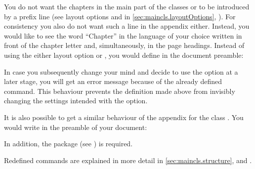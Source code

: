 \begin{Example}
  You do not want the chapters in the main part of the classes
   or  to be introduced by a prefix
  line (see layout options  and
   in \autoref{sec:maincls.layoutOptions},
  ). For consistency
  you also do not want such a line in the appendix either. Instead,
  you would like to see the word ``Chapter'' in the language of your
  choice written in front of the chapter letter and, simultaneously,
  in the page headings.  Instead of using the either layout option
   or , you would
  define in the document preamble:
%
\begin{lstcode}
  \newcommand*{\appendixmore}{%
    \renewcommand*{\chapterformat}{%
      \appendixname~\thechapter\autodot\enskip}
    \renewcommand*{\chaptermarkformat}{%
      \appendixname~\thechapter\autodot\enskip}
  }
\end{lstcode}
%  
  In case you subsequently change your mind and decide to use the option
   at a later stage, you will get an error message
  because of the already defined  command.  This behaviour
  prevents the definition made above from invisibly changing the settings
  intended with the option.
  
  It is also possible to get a similar behaviour of the appendix for
  the class . You would write in the preamble of your
  document:
\begin{lstcode}
  \newcommand*{\appendixmore}{%
    \renewcommand*{\othersectionlevelsformat}[1]{%
      \ifthenelse{\equal{##1}{section}}{\appendixname~}{}%
      \csname the##1\endcsname\autodot\enskip}
    \renewcommand*{\sectionmarkformat}{%
      \appendixname~\thesection\autodot\enskip}
  }
\end{lstcode}
  In addition, the package  (see
  \cite{package:ifthen}) is required.
  
  Redefined commands are explained in more detail in
  \autoref{sec:maincls.structure},
   and
  .
\end{Example}
%
%

\endinput

